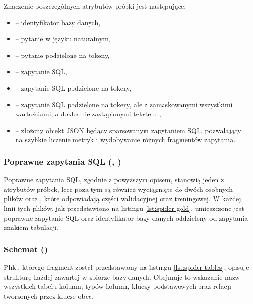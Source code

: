 \begin{minipage}{\linewidth}

\end{minipage}

Znaczenie poszczególnych atrybutów próbki jest następujące:\nobreakpar
\begin{itemize}
    \item \textbf{} -- identyfikator bazy danych,
    \item \textbf{} -- pytanie w języku naturalnym,
    \item \textbf{} -- pytanie podzielone na tokeny,
    \item \textbf{} -- zapytanie SQL,
    \item \textbf{} -- zapytanie SQL podzielone na tokeny,
    \item \textbf{} -- zapytanie SQL podzielone na tokeny, ale z zamaskowanymi wszystkimi wartościami, a dokładnie zastąpionymi tekstem ,
    \item \textbf{} -- złożony obiekt JSON będący sparsowanym zapytaniem SQL, pozwalający na szybkie liczenie metryk i wydobywanie różnych fragmentów zapytania.
\end{itemize}

\subsubsection{Poprawne zapytania SQL (, )}
Poprawne zapytania SQL, zgodnie z powyższym opisem, stanowią jeden z atrybutów próbek, lecz poza tym są również wyciągnięte do dwóch osobnych plików  oraz \mbox{}, które odpowiadają części walidacyjnej oraz treningowej. W każdej linii tych plików, jak przedstawiono na listingu \ref{lst:spider-gold}, umieszczone jest poprawne zapytanie SQL oraz identyfikator bazy danych oddzielony od zapytania znakiem tabulacji.

\begin{minipage}{\linewidth}

\end{minipage}

\subsubsection{Schemat ()}
Plik , którego fragment został przedstawiony na listingu \ref{lst:spider-tables}, opisuje strukturę każdej zawartej w zbiorze  bazy danych. Obejmuje to wskazanie nazw wszystkich tabel i kolumn, typów kolumn, kluczy podstawowych oraz relacji tworzonych przez klucze obce. 

